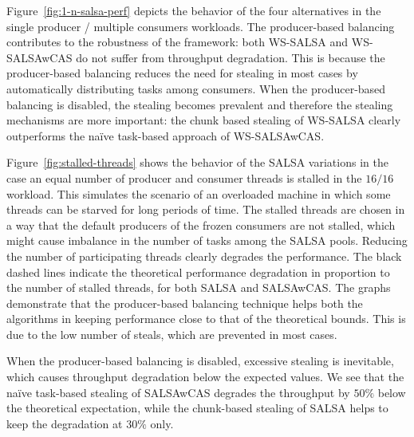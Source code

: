 Figure~\ref{fig:1-n-salsa-perf} depicts the behavior of the four alternatives in the single producer / multiple consumers workloads. 
The producer-based balancing contributes to the robustness of the framework: both WS-SALSA and WS-SALSAwCAS do not suffer from throughput degradation. This is because the producer-based balancing reduces the need for stealing in most cases by automatically distributing tasks among consumers. 
When the producer-based balancing is disabled, the stealing becomes prevalent and therefore the stealing mechanisms are more important: 
the chunk based stealing of WS-SALSA clearly outperforms the na\"{i}ve task-based approach of WS-SALSAwCAS. 

Figure~\ref{fig:stalled-threads} shows the behavior of the SALSA variations in the case an equal number of producer and consumer threads is stalled in the $16/16$ workload. This simulates the scenario of an overloaded machine in which some threads can be starved for long periods of time. 
The stalled threads are chosen in a way that the default producers of the frozen consumers are not stalled, which might cause imbalance in the number of tasks among the SALSA pools. 
Reducing the number of participating threads clearly degrades the performance. The black dashed lines indicate the theoretical performance degradation in proportion to the number of stalled threads, for both SALSA and SALSAwCAS. 
The graphs demonstrate that the producer-based balancing technique helps both the algorithms in keeping performance close to that of the theoretical bounds. This is due to the low number of steals, which are prevented in most cases.

When the producer-based balancing is disabled, excessive stealing is inevitable, which causes throughput degradation below the expected values. We see that the na\"{i}ve task-based stealing of SALSAwCAS degrades the throughput by $50\%$ below the theoretical expectation, while the chunk-based stealing of SALSA helps to keep the degradation at $30\%$ only. 

